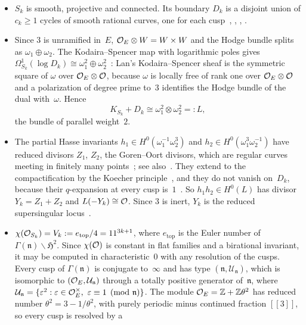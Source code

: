 \begin{itemize}
\item[(G1)] $S_k$ is smooth, projective and connected. Its boundary $D_k$ is a disjoint union of $c_k\ge1$ cycles of smooth
rational curves, one for each cusp~\cite[Theorem~5.1, Proposition~5.2 and Corollary~5.3]{Rapoport1978}, \cite{Chai1990},
\cite[Section~7]{Dimitrov2004}, \cite[Theorems~6.4.1.1 and~7.3.3.4]{Lan2013}.
\item[(G2)] Since $3$ is unramified in~$E$, $\mathcal{O}_E\otimes W=W\times W$ and the Hodge bundle splits as
$\omega_1\oplus\omega_2$. The Kodaira--Spencer map with logarithmic poles gives
$\Omega^1_{S_k}(\log D_k)\cong\omega_1^2\oplus\omega_2^2$~\cite[Theorem~6.4.1.1(4)]{Lan2013}: Lan's Kodaira--Spencer sheaf is the
symmetric square of $\omega$ over $\mathcal{O}_E\otimes\mathcal{O}$, because $\omega$ is locally free of rank one over $\mathcal{O}_E\otimes\mathcal{O}$ and a
polarization of degree prime to~$3$ identifies the Hodge bundle of the dual with~$\omega$. Hence
\[
  K_{S_k}+D_k\cong\omega_1^2\otimes\omega_2^2=:L,
\]
the bundle of parallel weight~$2$.
\item[(G3)] The partial Hasse invariants $h_1\in H^0(\omega_1^{-1}\omega_2^3)$ and $h_2\in H^0(\omega_1^3\omega_2^{-1})$ have
reduced divisors $Z_1$, $Z_2$, the Goren--Oort divisors, which are regular curves meeting in finitely many
points~\cite[Section~1 and Theorem~2.1(1)]{Goren2001}; see also~\cite{GorenOort2000,TianXiao2016}. They extend to the
compactification by the Koecher principle~\cite[Theorem~8.3]{Dimitrov2004}, and they do not vanish on~$D_k$, because their
$q$-expansion at every cusp is~$1$~\cite[Theorem~2.1(2)]{Goren2001}. So $h_1h_2\in H^0(L)$ has divisor $Y_k=Z_1+Z_2$ and
$L(-Y_k)\cong\mathcal{O}$. Since $3$ is inert, $Y_k$ is the reduced supersingular locus~\cite[Proposition~4.1]{BachmatGoren1999}.
\item[(G4)] $\chi(\mathcal{O}_{S_k})=V_k:=e_{\mathrm{top}}/4=11^{3k+1}$, where $e_{\mathrm{top}}$ is the Euler number of
$\Gamma(\mathfrak n)\backslash\mathfrak H^2$. Since $\chi(\mathcal{O})$ is constant in flat families and a birational invariant, it
may be computed in characteristic~$0$ with any resolution of the cusps. Every cusp of $\Gamma(\mathfrak n)$ is conjugate
to~$\infty$ and has type $(\mathfrak n,\mathcal U_{\mathfrak n})$, which is isomorphic to $(\mathcal{O}_E,\mathcal U_{\mathfrak n})$
through a totally positive generator of~$\mathfrak n$, where
$\mathcal U_{\mathfrak n}=\{\varepsilon^2:\varepsilon\in\mathcal{O}_E^\times,\ \varepsilon\equiv1\pmod{\mathfrak n}\}$. The module $\mathcal{O}_E=\mathbb{Z}+\mathbb{Z}\theta^2$ has
reduced number $\theta^2=3-1/\theta^2$, with purely periodic minus continued fraction $[[3]]$, so every cusp is resolved by a

\end{itemize}
